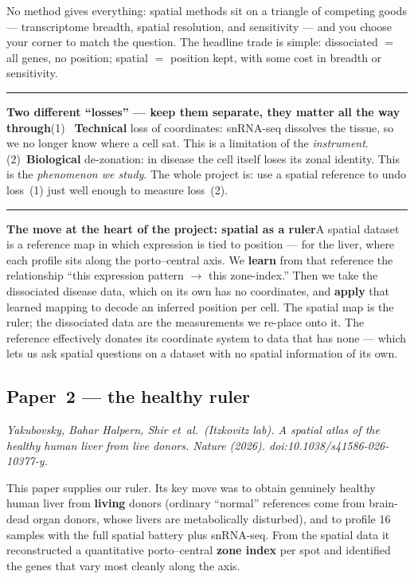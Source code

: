 \documentclass[11pt]{article}
\newcommand{\aside}[2]{\par\medskip\noindent\textcolor{teal0}{\rule{2pt}{\baselineskip}}\quad\textbf{\textcolor{teal0}{#1}}\quad #2\par\medskip}
\begin{document}
No method gives everything: spatial methods sit on a triangle of competing goods --- transcriptome
breadth, spatial resolution, and sensitivity --- and you choose your corner to match the question. The
headline trade is simple: dissociated $=$ all genes, no position; spatial $=$ position kept, with some
cost in breadth or sensitivity.

\aside{Two different ``losses'' --- keep them separate, they matter all the way through}{(1)~\textbf{
Technical} loss of coordinates: snRNA-seq dissolves the tissue, so we no longer know where a cell sat.
This is a limitation of the \emph{instrument}. (2)~\textbf{Biological} de-zonation: in disease the cell
itself loses its zonal identity. This is the \emph{phenomenon we study}. The whole project is: use a
spatial reference to undo loss~(1) just well enough to measure loss~(2).}

\aside{The move at the heart of the project: spatial as a ruler}{A spatial dataset is a reference map
in which expression is tied to position --- for the liver, where each profile sits along the
porto--central axis. We \textbf{learn} from that reference the relationship ``this expression pattern
$\to$ this zone-index.'' Then we take the dissociated disease data, which on its own has no coordinates,
and \textbf{apply} that learned mapping to decode an inferred position per cell. The spatial map is the
ruler; the dissociated data are the measurements we re-place onto it. The reference effectively donates
its coordinate system to data that has none --- which lets us ask spatial questions on a dataset with
no spatial information of its own.}

\subsection{Paper~2 --- the healthy ruler}

\noindent\textit{Yakubovsky, Bahar Halpern, Shir et~al.\ (Itzkovitz lab). A spatial atlas of the
healthy human liver from live donors. Nature (2026). doi:10.1038/s41586-026-10377-y.}

This paper supplies our ruler. Its key move was to obtain genuinely healthy human liver from
\textbf{living} donors (ordinary ``normal'' references come from brain-dead organ donors, whose livers
are metabolically disturbed), and to profile 16 samples with the full spatial battery plus snRNA-seq.
From the spatial data it reconstructed a quantitative porto--central \textbf{zone index} per spot and
identified the genes that vary most cleanly along the axis.
\end{document}
